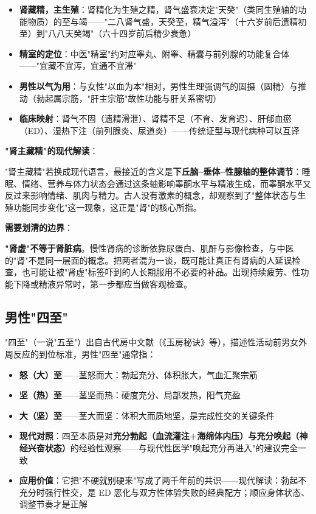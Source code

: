 \documentclass[12pt,a4paper,twoside]{ctexbook}
\begin{document}
\begin{itemize}
	\item \textbf{肾藏精，主生殖}：肾精化为生殖之精，肾气盛衰决定"天癸"（类同生殖轴的功能物质）的至与竭——"二八肾气盛，天癸至，精气溢泻"（十六岁前后遗精初至）到"八八天癸竭"（六十四岁前后精少衰惫）
	\item \textbf{精室的定位}：中医"精室"约对应睾丸、附睾、精囊与前列腺的功能复合体——"宜藏不宜泻，宜通不宜滞"
	\item \textbf{男性以气为用}：与女性"以血为本"相对，男性生理强调气的固摄（固精）与推动（勃起属宗筋，"肝主宗筋"故性功能与肝关系密切）
	\item \textbf{临床映射}：肾气不固（遗精滑泄）、肾精不足（不育、发育迟）、肝郁血瘀（ED）、湿热下注（前列腺炎、尿道炎）——传统证型与现代病种可以互译
\end{itemize}

\vspace{0.5em}
\noindent\textbf{"肾主藏精"的现代解读}：

"肾主藏精"若换成现代语言，最接近的含义是\textbf{下丘脑--垂体--性腺轴的整体调节}：睡眠、情绪、营养与体力状态会通过这条轴影响睾酮水平与精液生成，而睾酮水平又反过来影响情绪、肌肉与精力。古人没有激素的概念，却观察到了"整体状态与生殖功能同步变化"这一现象，这正是"肾"的核心所指。

\vspace{0.5em}
\noindent\textbf{需要划清的边界}：

\textbf{"肾虚"不等于肾脏病}。慢性肾病的诊断依靠尿蛋白、肌酐与影像检查，与中医的"肾"不是同一层面的概念。把两者混为一谈，既可能让真正有肾病的人延误检查，也可能让被"肾虚"标签吓到的人长期服用不必要的补品。出现持续疲劳、性功能下降或精液异常时，第一步都应当做客观检查。

\subsection{男性"四至"}


"四至"（一说"五至"）出自古代房中文献（《玉房秘诀》等），描述性活动前男女外周反应的到位标准，男性"四至"通常指：

\begin{itemize}
	\item \textbf{怒（大）至}——茎怒而大：勃起充分、体积胀大，气血汇聚宗筋
	\item \textbf{坚（热）至}——茎坚而热：硬度充分、局部发热，阳气充盈
	\item \textbf{大（坚）至}——茎大而坚：体积大而质地坚，是完成性交的关键条件
	\item \textbf{现代对照}：四至本质是对\textbf{充分勃起（血流灌注+海绵体内压）与充分唤起（神经兴奋状态）}的经验性观察——与现代性医学"唤起充分再进入"的建议完全一致
	\item \textbf{应用价值}：它把"不硬就别硬来"写成了两千年前的共识——现代解读：勃起不充分时强行性交，是 ED 恶化与双方性体验失败的经典配方；顺应身体状态、调整节奏才是正解
\end{itemize}
\end{document}
